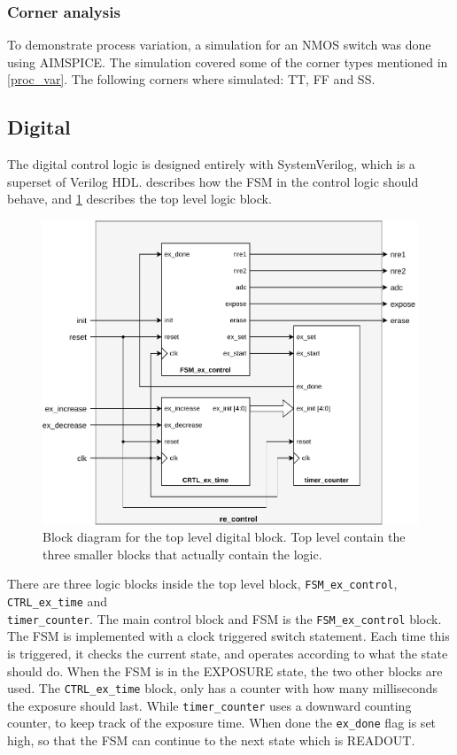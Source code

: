 \subsubsection{Corner analysis}
\label{Corn_analysis}
To demonstrate process variation, a simulation for an NMOS switch was done using AIMSPICE. 
The simulation covered some of the corner types mentioned in \cref{proc_var}. 
The following corners where simulated: TT, FF and SS.

\subsection{Digital}

The digital control logic is designed entirely with SystemVerilog, which is a superset of Verilog HDL.
 describes how the FSM in the control logic should behave, and \cref{fig:pros:dig:block} describes the top level logic block.

\begin{figure}[!htbp]
    \centering
    \includegraphics[width=.9\textwidth]{Images/Block_diagrams/re_control_block.pdf}
    \caption{Block diagram for the top level digital block. Top level contain the three smaller blocks that actually contain the logic.}
    \label{fig:pros:dig:block}
\end{figure}

There are three logic blocks inside the top level block, \texttt{FSM\_ex\_control}, \texttt{CTRL\_ex\_time} and\\ \texttt{timer\_counter}. 
The main control block and FSM is the \texttt{FSM\_ex\_control} block.
The FSM is implemented with a clock triggered switch statement. 
Each time this is triggered, it checks the current state, and operates according to what the state should do. 
When the FSM is in the EXPOSURE state, the two other blocks are used. 
The \texttt{CTRL\_ex\_time} block, only has a counter with how many milliseconds the exposure should last.
While \texttt{timer\_counter} uses a downward counting counter, to keep track of the exposure time. 
When done the \texttt{ex\_done} flag is set high, so that the FSM can continue to the next state which is READOUT.

